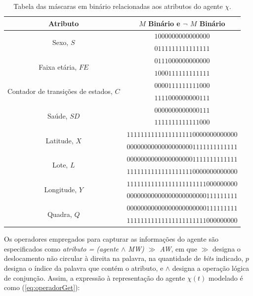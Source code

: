 \begin{table}[H]
\centering
\begin{tabular}{c|c}
 \textbf{Atributo}						& \textbf{$M$ Binário} e \textbf{$\neg$ $M$ Binário}    \\ \hline
 \multirow{2}{*}{Sexo, $S$}   					& $1000000000000000$  					\\
 								& $0111111111111111$ 					\\
 \multirow{2}{*}{Faixa etária, $FE$}   				& $0111000000000000$    				\\
 								& $1000111111111111$ 					\\
 \multirow{2}{*}{Contador de transições de estados, $C$}	& $0000111111111000$    				\\
 								& $1111000000000111$ 					\\
 \multirow{2}{*}{Saúde, $SD$}   				& $0000000000000111$    				\\
 								& $1111111111111000$ 					\\
 							
 \multirow{2}{*}{Latitude, $X$}   				& $11111111111111111110000000000000$    		\\
 								& $00000000000000000001111111111111$ 			\\
 \multirow{2}{*}{Lote, $L$}   					& $00000000000000000001111111111111$    		\\
 								& $11111111111111111110000000000000$ 			\\
 								
 \multirow{2}{*}{Longitude, $Y$}   				& $11111111111111111111111000000000$    		\\
 								& $00000000000000000000000111111111$ 			\\
 \multirow{2}{*}{Quadra, $Q$}   				& $00000000000000000000000111111111$    		\\
 								& $11111111111111111111111000000000$			\\
\end{tabular}
\caption{Tabela das máscaras em binário relacionadas aos atributos do agente $\chi$.}
\label{tab:mascarasBinario}
\end{table}

Os operadores empregados para capturar as informações do agente são especificados como \textit{atributo = (agente $\wedge$ MW) $\gg$ AW}, em que $\gg$ designa o deslocamento não circular à direita na palavra, na quantidade de \textit{bits} indicado, $p$ designa o índice da palavra que contém o atributo, e $\wedge$ designa a operação lógica de conjunção. Assim, a expressão à representação do agente $\chi(t)$ modelado é como (\ref{eq:operadorGet}):

